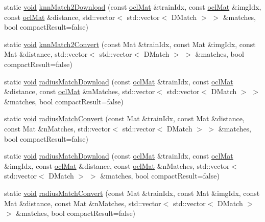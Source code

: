 \begin{DoxyCompactItemize}
\item 
static \hyperlink{legacy_8hpp_a8bb47f092d473522721002c86c13b94e}{void} \hyperlink{classcv_1_1ocl_1_1BruteForceMatcher__OCL__base_a23a31c03c91aa42abb3bf1b64a834ea3}{knn\-Match2\-Download} (const \hyperlink{classcv_1_1ocl_1_1oclMat}{ocl\-Mat} \&train\-Idx, const \hyperlink{classcv_1_1ocl_1_1oclMat}{ocl\-Mat} \&img\-Idx, const \hyperlink{classcv_1_1ocl_1_1oclMat}{ocl\-Mat} \&distance, std\-::vector$<$ std\-::vector$<$ D\-Match $>$ $>$ \&matches, bool compact\-Result=false)
\item 
static \hyperlink{legacy_8hpp_a8bb47f092d473522721002c86c13b94e}{void} \hyperlink{classcv_1_1ocl_1_1BruteForceMatcher__OCL__base_a9cb7ae54393d803349bbc37f6f0131aa}{knn\-Match2\-Convert} (const Mat \&train\-Idx, const Mat \&img\-Idx, const Mat \&distance, std\-::vector$<$ std\-::vector$<$ D\-Match $>$ $>$ \&matches, bool compact\-Result=false)
\item 
static \hyperlink{legacy_8hpp_a8bb47f092d473522721002c86c13b94e}{void} \hyperlink{classcv_1_1ocl_1_1BruteForceMatcher__OCL__base_ae0504c1717abce957cbcd18ded6a56b7}{radius\-Match\-Download} (const \hyperlink{classcv_1_1ocl_1_1oclMat}{ocl\-Mat} \&train\-Idx, const \hyperlink{classcv_1_1ocl_1_1oclMat}{ocl\-Mat} \&distance, const \hyperlink{classcv_1_1ocl_1_1oclMat}{ocl\-Mat} \&n\-Matches, std\-::vector$<$ std\-::vector$<$ D\-Match $>$ $>$ \&matches, bool compact\-Result=false)
\item 
static \hyperlink{legacy_8hpp_a8bb47f092d473522721002c86c13b94e}{void} \hyperlink{classcv_1_1ocl_1_1BruteForceMatcher__OCL__base_a1e2186cf894984ac2062aba44603ce67}{radius\-Match\-Convert} (const Mat \&train\-Idx, const Mat \&distance, const Mat \&n\-Matches, std\-::vector$<$ std\-::vector$<$ D\-Match $>$ $>$ \&matches, bool compact\-Result=false)
\item 
static \hyperlink{legacy_8hpp_a8bb47f092d473522721002c86c13b94e}{void} \hyperlink{classcv_1_1ocl_1_1BruteForceMatcher__OCL__base_aa5dec2e6ed73f5afc684206532ca8831}{radius\-Match\-Download} (const \hyperlink{classcv_1_1ocl_1_1oclMat}{ocl\-Mat} \&train\-Idx, const \hyperlink{classcv_1_1ocl_1_1oclMat}{ocl\-Mat} \&img\-Idx, const \hyperlink{classcv_1_1ocl_1_1oclMat}{ocl\-Mat} \&distance, const \hyperlink{classcv_1_1ocl_1_1oclMat}{ocl\-Mat} \&n\-Matches, std\-::vector$<$ std\-::vector$<$ D\-Match $>$ $>$ \&matches, bool compact\-Result=false)
\item 
static \hyperlink{legacy_8hpp_a8bb47f092d473522721002c86c13b94e}{void} \hyperlink{classcv_1_1ocl_1_1BruteForceMatcher__OCL__base_a0efd3f02741641c94739ef41b63b2fcb}{radius\-Match\-Convert} (const Mat \&train\-Idx, const Mat \&img\-Idx, const Mat \&distance, const Mat \&n\-Matches, std\-::vector$<$ std\-::vector$<$ D\-Match $>$ $>$ \&matches, bool compact\-Result=false)
\end{DoxyCompactItemize}
